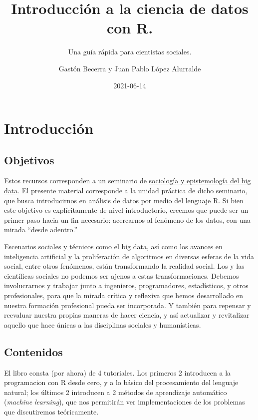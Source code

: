 \documentclass[
]{book}
\title{Introducción a la ciencia de datos con R.}
\subtitle{Una guía rápida para cientistas sociales.}
\author{Gastón Becerra y Juan Pablo López Alurralde}
\date{2021-06-14}
\begin{document}
\maketitle

{
\setcounter{tocdepth}{1}
\tableofcontents
}
\hypertarget{introducciuxf3n}{%
\chapter*{Introducción}\label{introducciuxf3n}}

\hypertarget{objetivos}{%
\section*{Objetivos}\label{objetivos}}

Estos recursos corresponden a un seminario de \href{https://www.academia.edu/48345036/Sociolog\%C3\%ADa_y_epistemolog\%C3\%ADa_del_Big_data}{sociología y epistemología del big data}.
El presente material corresponde a la unidad práctica de dicho seminario, que busca introducirnos en análisis de datos por medio del lenguaje R.
Si bien este objetivo es explícitamente de nivel introductorio, creemos que puede ser un primer paso hacia un fin necesario: acercarnos al fenómeno de los datos, con una mirada ``desde adentro.''

Escenarios sociales y técnicos como el big data, así como los avances en inteligencia artificial y la proliferación de algoritmos en diversas esferas de la vida social, entre otros fenómenos, están transformando la realidad social. Los y las científicas sociales no podemos ser ajenos a estas transformaciones. Debemos involucrarnos y trabajar junto a ingenieros, programadores, estadísticos, y otros profesionales, para que la mirada crítica y reflexiva que hemos desarrollado en nuestra formación profesional pueda ser incorporada. Y también para repensar y reevaluar nuestra propias maneras de hacer ciencia, y así actualizar y revitalizar aquello que hace únicas a las disciplinas sociales y humanísticas.

\hypertarget{contenidos}{%
\section*{Contenidos}\label{contenidos}}

El libro consta (por ahora) de 4 tutoriales. Los primeros 2 introducen a la programacion con R desde cero, y a lo básico del procesamiento del lenguaje natural; los últimos 2 introducen a 2 métodos de aprendizaje automático (\emph{machine learning}), que nos permitirán ver implementaciones de los problemas que discutiremos teóricamente.
\end{document}
